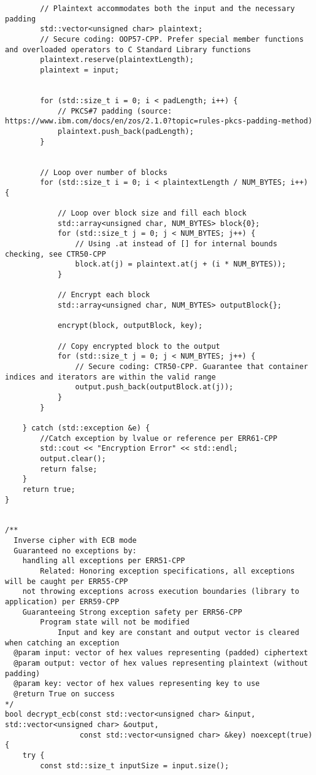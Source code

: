 \documentclass[a4paper,12pt]{article}
\begin{document}
{\begin{lstlisting}
        // Plaintext accommodates both the input and the necessary padding
        std::vector<unsigned char> plaintext;
        // Secure coding: OOP57-CPP. Prefer special member functions and overloaded operators to C Standard Library functions
        plaintext.reserve(plaintextLength);
        plaintext = input;


        for (std::size_t i = 0; i < padLength; i++) {
            // PKCS#7 padding (source: https://www.ibm.com/docs/en/zos/2.1.0?topic=rules-pkcs-padding-method)
            plaintext.push_back(padLength);
        }


        // Loop over number of blocks
        for (std::size_t i = 0; i < plaintextLength / NUM_BYTES; i++) {

            // Loop over block size and fill each block
            std::array<unsigned char, NUM_BYTES> block{0};
            for (std::size_t j = 0; j < NUM_BYTES; j++) {
                // Using .at instead of [] for internal bounds checking, see CTR50-CPP
                block.at(j) = plaintext.at(j + (i * NUM_BYTES));
            }

            // Encrypt each block
            std::array<unsigned char, NUM_BYTES> outputBlock{};

            encrypt(block, outputBlock, key);

            // Copy encrypted block to the output
            for (std::size_t j = 0; j < NUM_BYTES; j++) {
                // Secure coding: CTR50-CPP. Guarantee that container indices and iterators are within the valid range
                output.push_back(outputBlock.at(j));
            }
        }

    } catch (std::exception &e) {
        //Catch exception by lvalue or reference per ERR61-CPP
        std::cout << "Encryption Error" << std::endl;
        output.clear();
        return false;
    }
    return true;
}


/**
  Inverse cipher with ECB mode
  Guaranteed no exceptions by:
    handling all exceptions per ERR51-CPP
        Related: Honoring exception specifications, all exceptions will be caught per ERR55-CPP
    not throwing exceptions across execution boundaries (library to application) per ERR59-CPP
    Guaranteeing Strong exception safety per ERR56-CPP
        Program state will not be modified
            Input and key are constant and output vector is cleared when catching an exception
  @param input: vector of hex values representing (padded) ciphertext
  @param output: vector of hex values representing plaintext (without padding)
  @param key: vector of hex values representing key to use
  @return True on success
*/
bool decrypt_ecb(const std::vector<unsigned char> &input, std::vector<unsigned char> &output,
                 const std::vector<unsigned char> &key) noexcept(true) {
    try {
        const std::size_t inputSize = input.size();


\end{lstlisting}}
\end{document}

